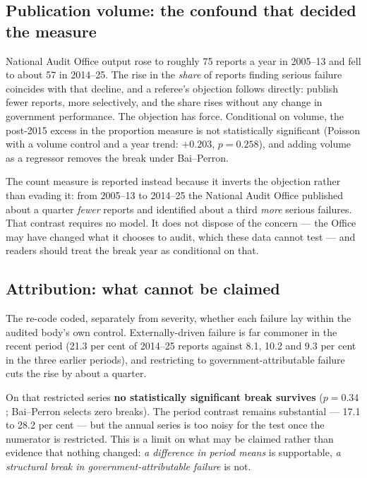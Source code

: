 \subsection*{Publication volume: the confound that decided the measure}

National Audit Office output rose to roughly 75 reports a year in 2005--13 and fell to about 57 in
2014--25. The rise in the \emph{share} of reports finding serious failure coincides with that
decline, and a referee's objection follows directly: publish fewer reports, more selectively, and
the share rises without any change in government performance. The objection has force. Conditional
on volume, the post-2015 excess in the proportion measure is not statistically significant
(Poisson with a volume control and a year trend: $+0.203$, $p=0.258$), and adding volume as a
regressor removes the break under Bai--Perron.

The count measure is reported instead because it inverts the objection rather than evading it:
from 2005--13 to 2014--25 the National Audit Office published about a quarter \emph{fewer} reports
and identified about a third \emph{more} serious failures. That contrast requires no model. It does
not dispose of the concern --- the Office may have changed what it chooses to audit, which these
data cannot test --- and readers should treat the break year as conditional on that.

\subsection*{Attribution: what cannot be claimed}

The re-code coded, separately from severity, whether each failure lay within the audited body's own
control. Externally-driven failure is far commoner in the recent period (21.3 per cent of
2014--25 reports against 8.1, 10.2 and 9.3 per cent in the three earlier periods), and restricting to
government-attributable failure cuts the rise by about a quarter.

On that restricted series \textbf{no statistically significant break survives} ($p=0.34$;
Bai--Perron selects zero breaks). The period contrast remains substantial --- 17.1 to 28.2 per cent
--- but the annual series is too noisy for the test once the numerator is restricted. This is a
limit on what may be claimed rather than evidence that nothing changed: \emph{a difference in period
means} is supportable, \emph{a structural break in government-attributable failure} is not.


